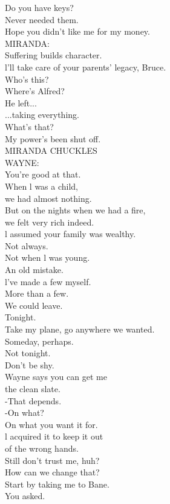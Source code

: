 \documentclass{article}
\begin{document}
\begin{multicols}{3}
Do you have keys?\\
Never needed them.\\
Hope you didn't like me for my money.\\
MIRANDA:\\
Suffering builds character.\\
l'll take care of your parents' legacy, Bruce.\\
Who's this?\\
Where's Alfred?\\
He left...\\
...taking everything.\\
What's that?\\
My power's been shut off.\\
MIRANDA CHUCKLES\\
WAYNE:\\
You're good at that.\\
When l was a child,\\
we had almost nothing.\\
But on the nights when we had a fire,\\
we felt very rich indeed.\\
l assumed your family was wealthy.\\
Not always.\\
Not when l was young.\\
An old mistake.\\
l've made a few myself.\\
More than a few.\\
We could leave.\\
Tonight.\\
Take my plane, go anywhere we wanted.\\
Someday, perhaps.\\
Not tonight.\\
Don't be shy.\\
Wayne says you can get me\\
the clean slate.\\
-That depends.\\
-On what?\\
On what you want it for.\\
l acquired it to keep it out\\
of the wrong hands.\\
Still don't trust me, huh?\\
How can we change that?\\
Start by taking me to Bane.\\
You asked.\\

\end{multicols}
\end{document}
